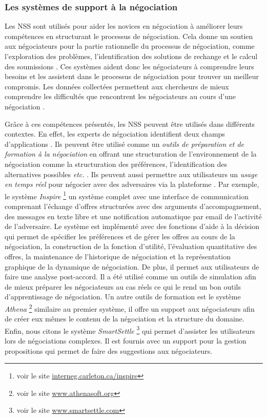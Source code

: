 		\subsubsection{Les systèmes de support à la négociation}
		\label{sec:1nss}
		
			 Les NSS sont utilisés pour aider les novices en négociation à améliorer leurs compétences en structurant le processus de négociation. Cela donne un soutien aux négociateurs pour la partie rationnelle du processus de négociation, comme l'exploration des problèmes, l'identification des solutions de rechange et le calcul des soumissions \cite{hindriks2008creating}. Ces systèmes aident donc les négociateurs à comprendre leurs besoins et les assistent dans le processus de négociation pour trouver un meilleur compromis. Les données collectées permettent aux chercheurs de mieux comprendre les difficultés que rencontrent les négociateurs au cours d'une négociation \cite{jonker2012negotiating}. 
			 
			 Grâce à ces compétences présentés, les NSS peuvent être utilisés dans différents contextes. En effet, les experts de négociation identifient deux champs d'applications \cite{pommeranz2009design}. Ils peuvent être utilisé comme un \textit{outils de préparation et de formation à la négociation} en offrant une structuration de l'environnement de la négociation comme la structuration des préférences, l'identification des alternatives possibles \emph{etc.} \cite{broekens2010affective}.  Ils peuvent aussi permettre aux utilisateurs un \textit{usage en temps réel} pour négocier avec des adversaires via la plateforme \cite{pommeranz2009design}. 
			 Par exemple, le système \emph{Inspire} \footnote{ voir le site \url{interneg.carleton.ca/inspire}} un système complet avec une interface de communication comprenant l'échange d'offres structurées avec des arguments d'accompagnement, des messages en texte libre et une notification automatique par email de l'activité de l'adversaire. Le système est implémenté avec des fonctions d'aide à la décision qui permet de spécifier les préférences et de gérer les offres au cours de la négociation, la construction de la fonction d'utilité, l'évaluation quantitative des offres, la maintenance de l'historique de négociation et la représentation graphique de la dynamique de négociation. De plus, il permet aux utilisateurs de faire une analyse post-accord. 
			 Il a été utilisé comme  un outils de simulation afin de mieux préparer les négociateurs au cas réels ce qui le rend un bon outils d'apprentissage de négociation. 
			 Un autre outils de formation est le système \emph{Athena} \footnote{ voir le site \url{www.athenasoft.org}} similaire au premier système, il offre un support aux négociateurs afin de créer eux mêmes le contenu de la négociation et la structure du domaine. Enfin, nous citons le système \emph{SmartSettle} \footnote{ voir le site \url{www.smartsettle.com}} qui permet d'assister les utilisateurs lors de négociations complexes. Il est fournis avec un support pour la gestion propositions qui permet de faire des suggestions aux négociateurs. 
			 
